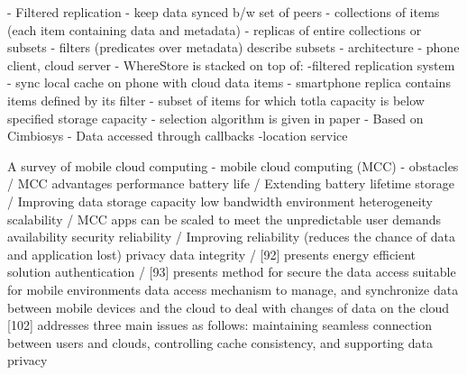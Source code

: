 				- Filtered replication
					- keep data synced b/w set of peers
						- collections of items (each item containing data and metadata)
						- replicas of entire collections or subsets
						- filters (predicates over metadata) describe subsets
				- architecture
					- phone client, cloud server
					- WhereStore is stacked on top of:
						-filtered replication system
							- sync local cache on phone with cloud data items
							- smartphone replica contains items defined by its filter
								- subset of items for which totla capacity is below specified storage capacity
								- selection algorithm is given in paper
							- Based on Cimbiosys
								- Data accessed through callbacks
						-location service
						
			A survey of mobile cloud computing
				- mobile cloud computing (MCC)
				- obstacles / MCC advantages
					performance 
						battery life / Extending battery lifetime
						storage / Improving data storage capacity
						low bandwidth
					environment
						heterogeneity
						scalability / MCC apps can be scaled to meet the unpredictable user demands
						availability
					security
						reliability / Improving reliability (reduces the chance of data and application lost)
						privacy
							data integrity / [92] presents energy efficient solution
							authentication / [93] presents method for secure the data access suitable for mobile environments
					data access
							mechanism to manage, and synchronize data between mobile devices and the cloud to deal with changes
of data on the cloud
						[102] addresses three main issues as follows: maintaining seamless connection between users and
clouds, controlling cache consistency, and supporting data privacy

